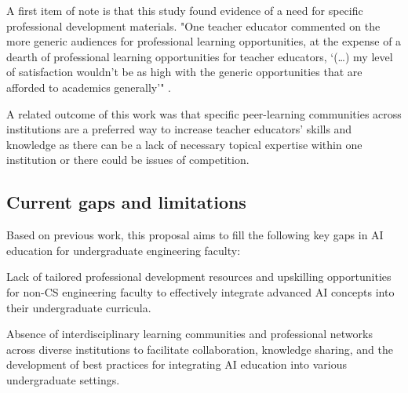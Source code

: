 \documentclass[11pt]{article}
\begin{document}
A first item of note is that this study found evidence of a need for specific professional development materials. 
"One teacher educator commented on the more generic audiences for professional learning opportunities, at the expense of a dearth of professional learning opportunities for teacher educators, ‘(…) my level of satisfaction wouldn’t be as high with the generic opportunities that are afforded to academics generally’" \cite{macphail2019professional}. 

A related outcome of this work was that specific peer-learning communities across institutions are a preferred way to increase teacher educators' skills and knowledge \cite{macphail2019professional} as there can be a lack of necessary topical expertise within one institution or there could be issues of competition.

\subsection{Current gaps and limitations}




Based on previous work, this proposal aims to fill the following key gaps in AI education for undergraduate engineering faculty:

\begin{gitemize0}
\item Lack of tailored professional development resources and upskilling opportunities for non-CS engineering faculty to effectively integrate advanced AI concepts into their undergraduate curricula.
\end{gitemize0}

\begin{gitemize3}
\item Absence of interdisciplinary learning communities and professional networks across diverse institutions to facilitate collaboration, knowledge sharing, and the development of best practices for integrating AI education into various undergraduate settings.
\end{gitemize3}
\end{document}
